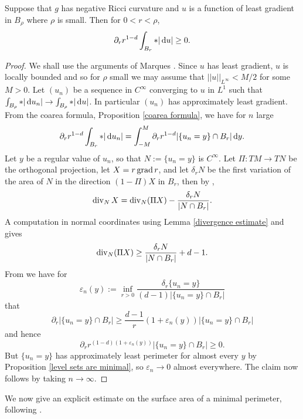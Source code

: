 \begin{proposition}\label{Monotonicity Formula}
Suppose that $g$ has negative Ricci curvature and $u$ is a function of least gradient in $B_\rho$ where $\rho$ is small. Then for $0 < r < \rho$,
$$\partial_r r^{1 - d} \int_{B_r} *|\mathop{}\!\mathrm{d} u| \geq 0.$$
\end{proposition}
\begin{proof}
We shall use the arguments of Marques \cite[Theorem 7.11]{MarquesXX}.
Since $u$ has least gradient, $u$ is locally bounded and so for $\rho$ small we may assume that $||u||_{L^\infty} < M/2$ for some $M > 0$.
Let $(u_n)$ be a sequence in $C^\infty$ converging to $u$ in $L^1$ such that $\int_{B_\rho} *|\mathop{}\!\mathrm{d} u_n| \to \int_{B_\rho} *|\mathop{}\!\mathrm{d} u|$.
In particular $(u_n)$ has approximately least gradient.
From the coarea formula, Proposition \ref{coarea formula}, we have for $n$ large
$$\partial_r r^{1 - d} \int_{B_r} *|\mathop{}\!\mathrm{d} u_n| = \int_{-M}^M \partial_r r^{1 - d} |\{u_n = y\} \cap B_r| \mathop{}\!\mathrm{d} y.$$
Let $y$ be a regular value of $u_n$, so that $N := \{u_n = y\}$ is $C^\infty$.
Let $\Pi: TM \to TN$ be the orthogonal projection, let $X = r\operatorname{grad} r$, and let $\delta_r N$ be the first variation of the area of $N$ in the direction $(1 - \Pi)X$ in $B_r$, then by \cite[Lemma 2.4, pg12]{MarquesXX},
$$\operatorname{div}_N X = \operatorname{div}_N(\Pi X) - \frac{\delta_r N}{|N \cap B_r|}.$$
A computation in normal coordinates using Lemma \ref{divergence estimate} and \cite[Proposition 7.4]{MarquesXX} gives
$$\operatorname{div}_N(\Pi X) \geq \frac{\delta_r N}{|N \cap B_r|} + d - 1.$$
From \cite[pg16]{MarquesXX} we have for 
$$\varepsilon_n(y) := \inf_{r > 0} \frac{\delta_r \{u_n = y\}}{(d - 1)|\{u_n = y\} \cap B_r|}$$
that
$$\partial_r |\{u_n = y\} \cap B_r| \geq \frac{d - 1}{r} (1 + \varepsilon_n(y)) |\{u_n = y\} \cap B_r|$$
and hence 
$$\partial_r r^{(1 - d)(1 + \varepsilon_n(y))} |\{u_n = y\} \cap B_r| \geq 0.$$
But $\{u_n = y\}$ has approximately least perimeter for almost every $y$ by Proposition \ref{level sets are minimal}, so $\varepsilon_n \to 0$ almost everywhere.
The claim now follows by taking $n \to \infty$.
\end{proof}

We now give an explicit estimate on the surface area of a minimal perimeter, following \cite[pg74]{Giusti77}.

